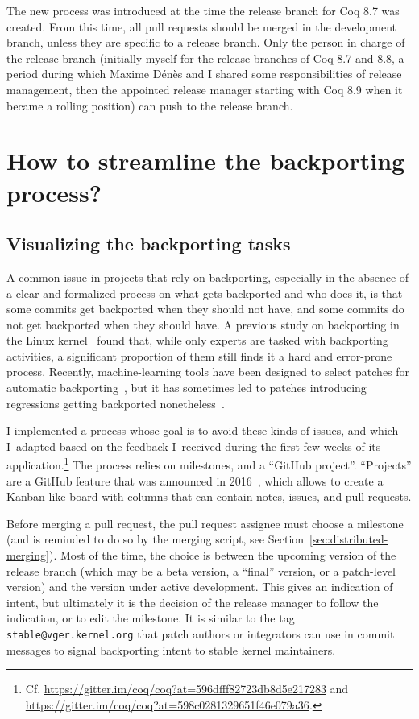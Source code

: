 The new process was introduced at the time the release branch for Coq 8.7 was created.
From this time, all pull requests should be merged in the development branch, unless they are specific to a release branch.
Only the person in charge of the release branch (initially myself for the release branches of Coq 8.7 and 8.8, a period during which Maxime D\'en\`es and I shared some responsibilities of release management, then the appointed release manager starting with Coq 8.9 when it became a rolling position) can push to the release branch.

\section{How to streamline the backporting process?}

\label{sec:backporting}

\subsection{Visualizing the backporting tasks}

A common issue in projects that rely on backporting, especially in the absence of a clear and formalized process on what gets backported and who does it, is that some commits get backported when they should not have, and some commits do not get backported when they should have.
A previous study on backporting in the Linux kernel~\cite{hua2014case} found that, while only experts are tasked with backporting activities, a significant proportion of them still finds it a hard and error-prone process.
Recently, machine-learning tools have been designed to select patches for automatic backporting~\cite{edge2018machine,hoang2019patchnet,wen2019ptracer}, but it has sometimes led to patches introducing regressions getting backported nonetheless~\cite{corbet2019linux}.

I implemented a process whose goal is to avoid these kinds of issues, and which I adapted based on the feedback I received during the first few weeks of its application.\footnote{
	Cf. \url{https://gitter.im/coq/coq?at=596dfff82723db8d5e217283} and \url{https://gitter.im/coq/coq?at=598c0281329651f46e079a36}.
}
The process relies on milestones, and a ``GitHub project''.
``Projects'' are a GitHub feature that was announced in 2016~\cite{github_projects_announcement}, which allows to create a Kanban-like board with columns that can contain notes, issues, and pull requests.

Before merging a pull request, the pull request assignee must choose a milestone (and is reminded to do so by the merging script, see Section~\ref{sec:distributed-merging}).
Most of the time, the choice is between the upcoming version of the release branch (which may be a beta version, a ``final'' version, or a patch-level version) and the version under active development.
This gives an indication of intent, but ultimately it is the decision of the release manager to follow the indication, or to edit the milestone.
It is similar to the tag \verb|stable@vger.kernel.org| that patch authors or integrators can use in commit messages to signal backporting intent to stable kernel maintainers.

